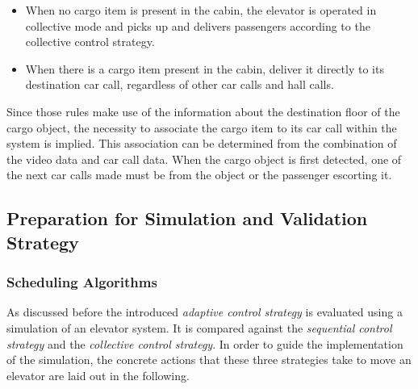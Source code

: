 \begin{itemize}
    \item When no cargo item is present in the cabin, the elevator is operated in collective mode and picks up and delivers passengers according to the collective control strategy.
    \item When there is a cargo item present in the cabin, deliver it directly to its destination car call, regardless of other car calls and hall calls.
\end{itemize}

Since those rules make use of the information about the destination floor of the cargo object, the necessity to associate the cargo item to its car call within the system is implied.
This association can be determined from the combination of the video data and car call data.
When the cargo object is first detected, one of the next car calls made must be from the object or the passenger escorting it.

\subsection{Preparation for Simulation and Validation Strategy}

\subsubsection{Scheduling Algorithms}

As discussed before the introduced \emph{adaptive control strategy} is evaluated using a simulation of an elevator system. 
It is compared against the \emph{sequential control strategy} and the \emph{collective control strategy}.
In order to guide the implementation of the simulation, the concrete actions that these three strategies take to move an elevator are laid out in the following.

